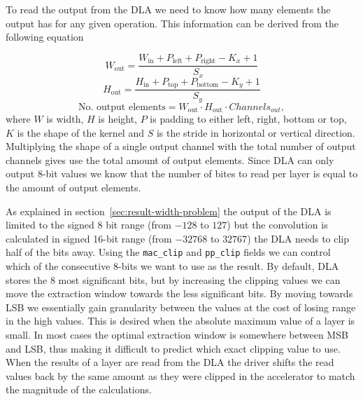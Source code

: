 \documentclass[12pt,a4paper,english
]{tunithesis}
\begin{document}
To read the output from the DLA we need to know how many elements the output has for any given operation. This information can be derived from the following equation

\begin{equation}
W_{\text{out}} = \frac{W_{\text{in}} + P_{\text{left}} + P_{\text{right}} - K_x + 1}{S_x}
\end{equation}
\begin{equation}
H_{\text{out}} = \frac{H_{\text{in}} + P_{\text{top}} + P_{\text{bottom}} - K_y + 1}{S_y}
\end{equation}
\begin{equation}
\text{No. output elements} = W_{\text{out}} \cdot H_{\text{out}} \cdot Channels_{out},
\end{equation}
where $W$ is width, $H$ is height, $P$ is padding to either left, right, bottom or top, $K$ is the shape of the kernel and $S$ is the stride in horizontal or vertical direction.
Multiplying the shape of a single output channel with the total number of output channels gives use the total amount of output elements. Since DLA can only output 8-bit values we know that the number of bites to read per layer is equal to the amount of output elements.

As explained in section~\ref{sec:result-width-problem} the output of the DLA is limited to the signed 8 bit range (from $-128$ to $127$) but the convolution is calculated in signed 16-bit range (from $-32768$ to $32767$) the DLA needs to clip half of the bits away. Using the \texttt{mac\_clip} and \texttt{pp\_clip} fields we can control which of the consecutive 8-bits we want to use as the result. By default, DLA stores the 8 most significant bits, but by increasing the clipping values we can move the extraction window towards the less significant bits. By moving towards LSB we essentially gain granularity between the values at the cost of losing range in the high values. This is desired when the absolute maximum value of a layer is small. In most cases the optimal extraction window is somewhere between MSB and LSB, thus making it difficult to predict which exact clipping value to use. When the results of a layer are read from the DLA the driver shifts the read values back by the same amount as they were clipped in the accelerator to match the magnitude of the calculations.
\end{document}
